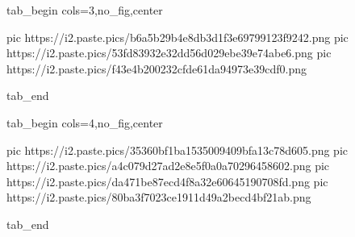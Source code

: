  
 
 
 
 


\ifcmt
  tab_begin cols=3,no_fig,center

     pic https://i2.paste.pics/b6a5b29b4e8db3d1f3e69799123f9242.png
		 pic https://i2.paste.pics/53fd83932e32dd56d029ebe39e74abe6.png
		 pic https://i2.paste.pics/f43e4b200232cfde61da94973e39cdf0.png

  tab_end

  tab_begin cols=4,no_fig,center

		 pic https://i2.paste.pics/35360bf1ba1535009409bfa13c78d605.png
		 pic https://i2.paste.pics/a4c079d27ad2e8e5f0a0a70296458602.png
		 pic https://i2.paste.pics/da471be87ecd4f8a32e60645190708fd.png
		 pic https://i2.paste.pics/80ba3f7023ce1911d49a2becd4bf21ab.png

  tab_end
\fi
